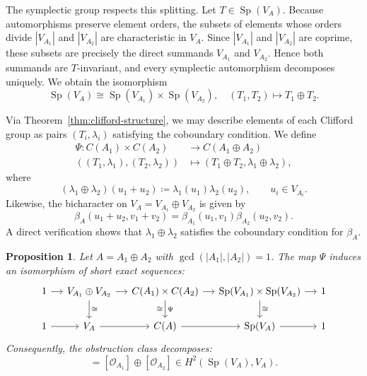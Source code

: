 \documentclass[11pt, reqno]{amsart}
\newtheorem{proposition}[theorem]{Proposition}
\theoremstyle{definition}
\theoremstyle{remark}
\newcommand{\cO}{\mathcal{O}}
\DeclareMathOperator{\Sp}{Sp}
\begin{document}
The symplectic group respects this splitting. Let $T \in \Sp(V_A)$. Because automorphisms preserve element orders, the subsets of elements whose orders divide $|V_{A_1}|$ and $|V_{A_2}|$ are characteristic in $V_A$. Since $|V_{A_1}|$ and $|V_{A_2}|$ are coprime, these subsets are precisely the direct summands $V_{A_1}$ and $V_{A_2}$. Hence both summands are $T$-invariant, and every symplectic automorphism decomposes uniquely. We obtain the isomorphism
\begin{equation}
\Sp(V_A) \cong \Sp(V_{A_1}) \times \Sp(V_{A_2}), \quad (T_1, T_2) \mapsto T_1 \oplus T_2.
\end{equation}

Via Theorem~\ref{thm:clifford-structure}, we may describe elements of each Clifford group as pairs $(T_i,\lambda_i)$ satisfying the coboundary condition. We define
\begin{align}
\Psi: C(A_1) \times C(A_2) &\to C(A_1 \oplus A_2) \nonumber \\
((T_1, \lambda_1), (T_2, \lambda_2)) &\mapsto (T_1 \oplus T_2, \lambda_1 \oplus \lambda_2),
\end{align}
where
\[
(\lambda_1 \oplus \lambda_2)(u_1 + u_2) \coloneqq \lambda_1(u_1)\lambda_2(u_2),
\qquad u_i\in V_{A_i}.
\]
Likewise, the bicharacter on $V_A=V_{A_1}\oplus V_{A_2}$ is given by
\[
\beta_A(u_1+u_2,v_1+v_2)=\beta_{A_1}(u_1,v_1)\beta_{A_2}(u_2,v_2).
\]
A direct verification shows that $\lambda_1 \oplus \lambda_2$ satisfies the coboundary condition for $\beta_A$.

\begin{proposition}\label{prop:coprime-decomp}
Let $A = A_1 \oplus A_2$ with $\gcd(|A_1|, |A_2|) = 1$. The map $\Psi$ induces an isomorphism of short exact sequences:
\begin{equation}
\begin{tikzcd}[column sep=small]
1 \arrow[r] & V_{A_1} \oplus V_{A_2} \arrow[r] \arrow[d, "\cong"] & C(A_1) \times C(A_2) \arrow[r] \arrow[d, "\Psi", "\cong"'] & \Sp(V_{A_1}) \times \Sp(V_{A_2}) \arrow[r] \arrow[d, "\cong"] & 1 \\
1 \arrow[r] & V_A \arrow[r] & C(A) \arrow[r] & \Sp(V_A) \arrow[r] & 1
\end{tikzcd}
\end{equation}
Consequently, the obstruction class decomposes:
\begin{equation}
[\cO_A] = [\cO_{A_1}] \oplus [\cO_{A_2}] \in H^2(\Sp(V_A), V_A).
\end{equation}
\end{proposition}
\end{document}
